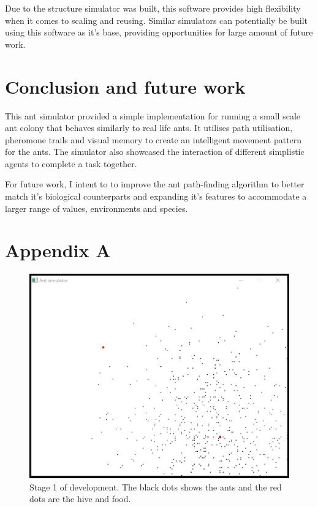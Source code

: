 \documentclass[a4paper, oneside, 11pt]{report}
\begin{document}
Due to the structure simulator was built, this software provides high flexibility when it comes to scaling and reusing. Similar simulators can potentially be built using this software as it's base, providing opportunities for large amount of future work.

\chapter{Conclusion and future work}
\label{chap:conclusion}
This ant simulator provided a simple implementation for running a small scale ant colony that behaves similarly to real life ants. It utilises path utilisation, pheromone trails and visual memory to create an intelligent movement pattern for the ants. The simulator also showcased the interaction of different simplistic agents to complete a task together.

For future work, I intent to to improve the ant path-finding algorithm to better match it's biological counterparts and expanding it's features to accommodate a larger range of values, environments and species.





\chapter*{Appendix A}
\begin{figure}[htb]
	\begin{center}
		\includegraphics[width=0.65 \columnwidth]{Stage_1.jpg}
		\caption{Stage 1 of development. The black dots shows the ants and the red dots are the hive and food.}
		\label{fig:Stage 1}
	\end{center}
\end{figure}
\end{document}
